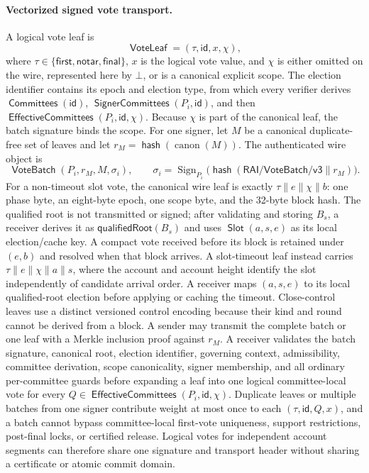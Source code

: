 \documentclass[sigplan,twocolumn,review,anonymous]{acmart}
\newcommand{\func}[1]{\operatorname{\mathsf{#1}}}
\newcommand{\hash}{\func{hash}}
\newcommand{\id}{\mathsf{id}}
\newcommand{\Slot}{\func{Slot}}
\newcommand{\VoteBatch}{\func{VoteBatch}}
\newcommand{\VoteLeaf}{\func{VoteLeaf}}
\newcommand{\SignerCommittees}{\func{SignerCommittees}}
\newcommand{\EffectiveCommittees}{\func{EffectiveCommittees}}
\newcommand{\Committees}{\func{Committees}}
\begin{document}
\paragraph{Vectorized signed vote transport.}
A logical vote leaf is
\[
\VoteLeaf=(\tau,\id,x,\chi),
\]
where \(\tau\in\{\mathsf{first},\mathsf{notar},\mathsf{final}\}\), \(x\) is the logical vote value,
and \(\chi\) is either omitted on the wire, represented here by \(\bot\), or is a canonical explicit
scope.  The election identifier contains its epoch and election type, from which every verifier derives
\(\Committees(\id)\), \(\SignerCommittees(P_i,\id)\), and then
\(\EffectiveCommittees(P_i,\id,\chi)\).  Because \(\chi\) is part of the canonical leaf, the batch
signature binds the scope.  For one signer, let \(M\) be a canonical
duplicate-free set of leaves and let \(r_M=\hash(\operatorname{canon}(M))\).  The authenticated wire
object is
\[
\VoteBatch(P_i,r_M,M,\sigma_i),
\qquad
\sigma_i=\operatorname{Sign}_{P_i}
 \bigl(\hash(\mathsf{RAI/VoteBatch/v3}\parallel r_M)\bigr).
\]
For a non-timeout slot vote, the canonical wire leaf is exactly
\(\tau\parallel e\parallel\chi\parallel b\): one phase byte, an eight-byte epoch, one scope byte,
and the 32-byte block hash.  The qualified root is not transmitted or signed; after validating and
storing \(B_s\), a receiver derives it as \(\mathsf{qualifiedRoot}(B_s)\) and uses
\(\Slot(a,s,e)\) as its local election/cache key.  A compact vote received before its block is retained
under \((e,b)\) and resolved when that block arrives.  A slot-timeout leaf instead carries
\(\tau\parallel e\parallel\chi\parallel a\parallel s\), where the account and account height identify
the slot independently of candidate arrival order.  A receiver maps \((a,s,e)\) to its local qualified-root
election before applying or caching the timeout.  Close-control leaves use a distinct versioned control
encoding because their kind and round cannot be derived from a block.
A sender may transmit the complete batch or one leaf with a Merkle inclusion proof against \(r_M\).
A receiver validates the batch signature, canonical root, election identifier, governing context,
admissibility, committee derivation, scope canonicality, signer membership, and all ordinary
per-committee guards before expanding a leaf into one logical committee-local vote for every
\(Q\in\EffectiveCommittees(P_i,\id,\chi)\).  Duplicate leaves or multiple batches from one signer
contribute weight at most once to each \((\tau,\id,Q,x)\), and a batch cannot bypass committee-local
first-vote uniqueness, support restrictions, post-final locks, or certified release.  Logical votes for
independent account segments can therefore share one signature and transport header without sharing a
certificate or atomic commit domain.
\end{document}
